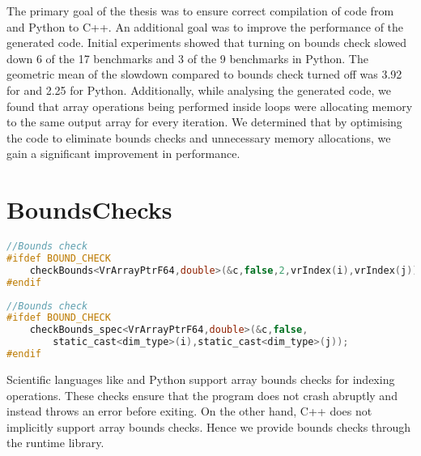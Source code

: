 The primary goal of the thesis was to ensure correct compilation of code from \matlab and Python to C++. An additional goal was to improve the performance of the generated code. Initial experiments showed that turning on bounds check slowed down 6 of the 17 benchmarks and 3 of the 9 benchmarks in Python. The geometric mean of the slowdown compared to bounds check turned off was 3.92 for \matlab and 2.25 for Python. Additionally, while analysing the generated code, we found that array operations being performed inside loops were allocating memory to the same output array for every iteration. We determined that by optimising the code to eliminate bounds checks and unnecessary memory allocations, we gain a significant improvement in performance. 
\section{BoundsChecks}
\begin{lstlisting}[float,language=c,caption={An example of the bounds check function call.},label={lst:boundscheck}]
//Bounds check 
#ifdef BOUND_CHECK
	checkBounds<VrArrayPtrF64,double>(&c,false,2,vrIndex(i),vrIndex(j));
#endif
\end{lstlisting}
\begin{lstlisting}[float,language=c,caption={An example of the specialised bounds check function call},label={lst:boundscheck_spec}]
//Bounds check 
#ifdef BOUND_CHECK
	checkBounds_spec<VrArrayPtrF64,double>(&c,false,
		static_cast<dim_type>(i),static_cast<dim_type>(j));
#endif
\end{lstlisting}
Scientific languages like \matlab and Python support array bounds checks for indexing operations. These checks ensure that the program does not crash abruptly and instead throws an error before exiting. On the other hand, C++ does not implicitly support array bounds checks. Hence we provide bounds checks through the runtime library. \\
